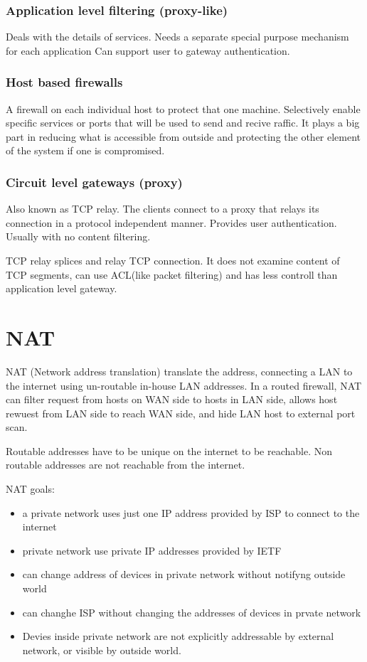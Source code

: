\subsection{Application level filtering (proxy-like)}
Deals with the details of services. Needs a separate special purpose mechanism for each application
Can support user to gateway authentication.

\subsection{Host based firewalls}
A firewall on each individual host to protect that one machine. Selectively enable specific services or ports that will be used to send and recive raffic.
It plays a big part in reducing what is accessible from outside and protecting the other element of the system if one is compromised.

\subsection{Circuit level gateways (proxy)}
Also known as TCP relay. The clients connect to a proxy that relays its connection in a protocol independent manner.
Provides user authentication. Usually with no content filtering.

TCP relay splices and relay TCP connection. It does not examine content of TCP segments, can use ACL(like packet filtering) and has less controll than application level gateway.

\chapter{NAT}
NAT (Network address translation) translate the address, connecting a LAN to the internet using un-routable in-house LAN addresses.
In a routed firewall, NAT can filter request from hosts on WAN side to hosts in LAN side, allows host rewuest from LAN side to reach WAN side, and hide LAN host to external port scan.

Routable addresses have to be unique on the internet to be reachable. Non routable addresses are not reachable from the internet.

NAT goals:
\begin{itemize}
    \item a private network uses just one IP address provided by ISP to connect to the internet
    \item private network use private IP addresses provided by IETF
    \item can change address of devices in private network without notifyng outside world
    \item can changhe ISP without changing the addresses of devices in prvate network
    \item Devies inside private network are not explicitly addressable by external network, or visible by outside world.
\end{itemize}

